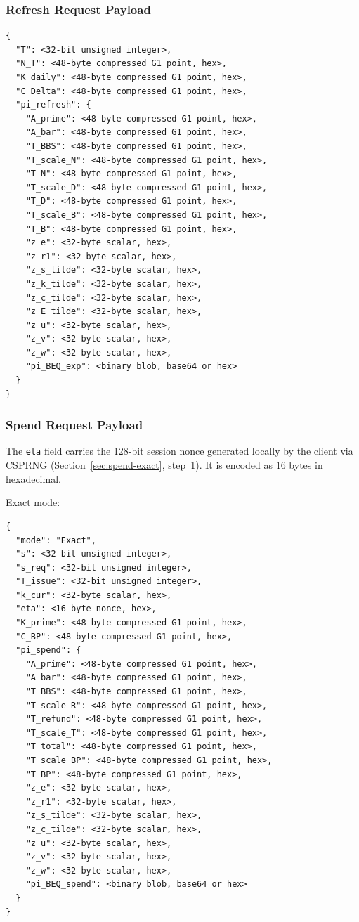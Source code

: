\documentclass[11pt]{article}
\theoremstyle{definitionstyle}
\theoremstyle{plain}
\begin{document}
\subsubsection{Refresh Request Payload}
\begin{verbatim}
{
  "T": <32-bit unsigned integer>,
  "N_T": <48-byte compressed G1 point, hex>,
  "K_daily": <48-byte compressed G1 point, hex>,
  "C_Delta": <48-byte compressed G1 point, hex>,
  "pi_refresh": {
    "A_prime": <48-byte compressed G1 point, hex>,
    "A_bar": <48-byte compressed G1 point, hex>,
    "T_BBS": <48-byte compressed G1 point, hex>,
    "T_scale_N": <48-byte compressed G1 point, hex>,
    "T_N": <48-byte compressed G1 point, hex>,
    "T_scale_D": <48-byte compressed G1 point, hex>,
    "T_D": <48-byte compressed G1 point, hex>,
    "T_scale_B": <48-byte compressed G1 point, hex>,
    "T_B": <48-byte compressed G1 point, hex>,
    "z_e": <32-byte scalar, hex>,
    "z_r1": <32-byte scalar, hex>,
    "z_s_tilde": <32-byte scalar, hex>,
    "z_k_tilde": <32-byte scalar, hex>,
    "z_c_tilde": <32-byte scalar, hex>,
    "z_E_tilde": <32-byte scalar, hex>,
    "z_u": <32-byte scalar, hex>,
    "z_v": <32-byte scalar, hex>,
    "z_w": <32-byte scalar, hex>,
    "pi_BEQ_exp": <binary blob, base64 or hex>
  }
}
\end{verbatim}

\subsubsection{Spend Request Payload}
The \texttt{eta} field carries the 128-bit session nonce generated locally by the client via CSPRNG (Section~\ref{sec:spend-exact}, step~1). It is encoded as 16 bytes in hexadecimal.

Exact mode:
\begin{verbatim}
{
  "mode": "Exact",
  "s": <32-bit unsigned integer>,
  "s_req": <32-bit unsigned integer>,
  "T_issue": <32-bit unsigned integer>,
  "k_cur": <32-byte scalar, hex>,
  "eta": <16-byte nonce, hex>,
  "K_prime": <48-byte compressed G1 point, hex>,
  "C_BP": <48-byte compressed G1 point, hex>,
  "pi_spend": {
    "A_prime": <48-byte compressed G1 point, hex>,
    "A_bar": <48-byte compressed G1 point, hex>,
    "T_BBS": <48-byte compressed G1 point, hex>,
    "T_scale_R": <48-byte compressed G1 point, hex>,
    "T_refund": <48-byte compressed G1 point, hex>,
    "T_scale_T": <48-byte compressed G1 point, hex>,
    "T_total": <48-byte compressed G1 point, hex>,
    "T_scale_BP": <48-byte compressed G1 point, hex>,
    "T_BP": <48-byte compressed G1 point, hex>,
    "z_e": <32-byte scalar, hex>,
    "z_r1": <32-byte scalar, hex>,
    "z_s_tilde": <32-byte scalar, hex>,
    "z_c_tilde": <32-byte scalar, hex>,
    "z_u": <32-byte scalar, hex>,
    "z_v": <32-byte scalar, hex>,
    "z_w": <32-byte scalar, hex>,
    "pi_BEQ_spend": <binary blob, base64 or hex>
  }
}
\end{verbatim}
\end{document}
